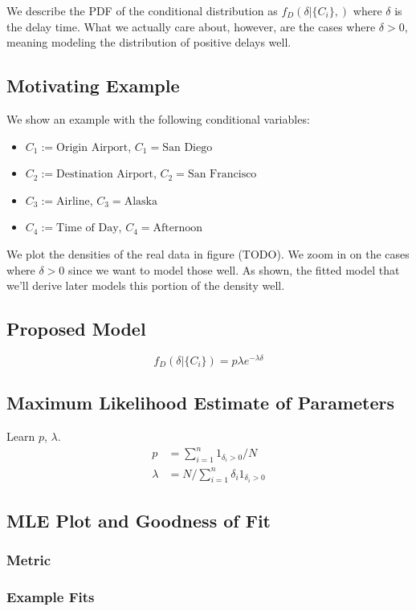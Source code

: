 \documentclass{article}
\begin{document}
We describe the PDF of the conditional distribution as $f_D(\delta|\{C_i\}, )$ where $\delta$ is the delay time. What we actually care about, however, are
the cases where $\delta > 0$, meaning modeling the distribution of positive delays well.

\subsection{Motivating Example}
We show an example with the following conditional variables:
\begin{itemize}
  \item $C_1 := \text{Origin Airport}$, $C_1 = \text{San Diego}$
  \item $C_2 := \text{Destination Airport}$, $C_2 = \text{San Francisco}$
  \item $C_3 := \text{Airline}$, $C_3 = \text{Alaska}$
  \item $C_4 := \text{Time of Day}$, $C_4 = \text{Afternoon}$
\end{itemize}
We plot the densities of the real data in figure (TODO). We zoom in on the cases where $\delta > 0$ since we want to model those well.
As shown, the fitted model that we'll derive later models this portion of the density well.

\subsection{Proposed Model}

$$f_D(\delta|\{C_i\}) = p\lambda e^{-\lambda \delta}$$

\subsection{Maximum Likelihood Estimate of Parameters}
Learn $p$, $\lambda$.
\begin{align*}
    p &= \sum_{i=1}^n 1_{\delta_i > 0} / N \\
    \lambda &= N / \sum_{i=1}^n \delta_i 1_{\delta_i > 0}
\end{align*}

\subsection{MLE Plot and Goodness of Fit}
\subsubsection{Metric}
\subsubsection{Example Fits}
\end{document}
